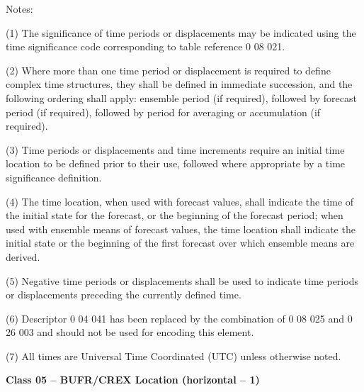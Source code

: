 Notes:

(1) The significance of time periods or displacements may be indicated using the time significance code corresponding to table reference 0 08 021.

(2) Where more than one time period or displacement is required to define complex time structures, they shall be defined in immediate succession, and the following ordering shall apply: ensemble period (if required), followed by forecast period (if required), followed by period for averaging or accumulation (if required).

(3) Time periods or displacements and time increments require an initial time location to be defined prior to their use, followed where appropriate by a time significance definition.

(4) The time location, when used with forecast values, shall indicate the time of the initial state for the forecast, or the beginning of the forecast period; when used with ensemble means of forecast values, the time location shall indicate the initial state or the beginning of the first forecast over which ensemble means are derived.

(5) Negative time periods or displacements shall be used to indicate time periods or displacements preceding the currently defined time.

(6) Descriptor 0 04 041 has been replaced by the combination of 0 08 025 and 0 26 003 and should not be used for encoding this element.

(7) All times are Universal Time Coordinated (UTC) unless otherwise noted.

\textbf{Class 05 -- BUFR/CREX Location (horizontal -- 1)}

